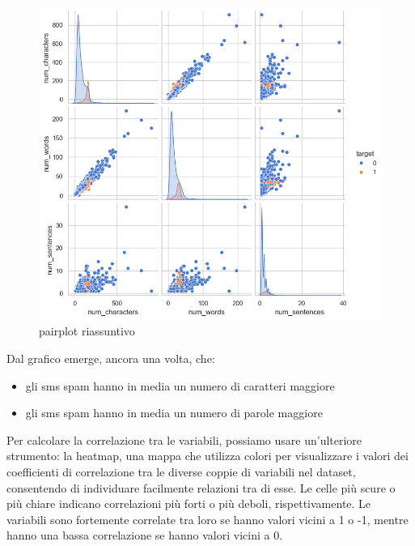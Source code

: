 \documentclass[]{article}
\begin{document}
        \begin{figure}[H]
            \centering
            \includegraphics[width=1\linewidth]{images/sns_riassuntivo.png}
            \caption{pairplot riassuntivo}
            \label{fig:enter-label}
        \end{figure}

        Dal grafico emerge, ancora una volta, che:
        \begin{itemize}
        \item gli sms spam hanno in media un numero di caratteri maggiore
        \item gli sms spam hanno in media un numero di parole maggiore
        \end{itemize}

        Per calcolare la correlazione tra le variabili, possiamo usare un'ulteriore strumento: la heatmap, una mappa che utilizza colori per visualizzare i valori dei coefficienti di correlazione tra le diverse coppie di variabili nel dataset, consentendo di individuare facilmente relazioni tra di esse. Le celle più scure o più chiare indicano correlazioni più forti o più deboli, rispettivamente. Le variabili sono fortemente correlate tra loro se hanno valori vicini a 1 o -1, mentre hanno una bassa correlazione se hanno valori vicini a 0.
\end{document}
